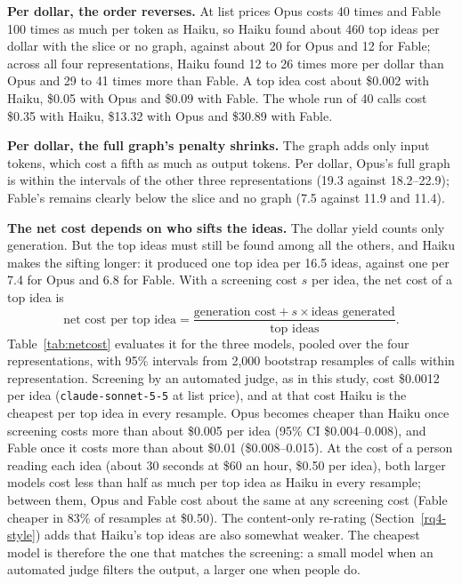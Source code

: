 \textbf{Per dollar, the order reverses.} At list prices Opus costs 40 times and Fable 100 times as much per token as Haiku, so Haiku found about 460 top ideas per dollar with the slice or no graph, against about 20 for Opus and 12 for Fable; across all four representations, Haiku found 12 to 26 times more per dollar than Opus and 29 to 41 times more than Fable. A top idea cost about \$0.002 with Haiku, \$0.05 with Opus and \$0.09 with Fable. The whole run of 40 calls cost \$0.35 with Haiku, \$13.32 with Opus and \$30.89 with Fable.

\textbf{Per dollar, the full graph's penalty shrinks.} The graph adds only input tokens, which cost a fifth as much as output tokens. Per dollar, Opus's full graph is within the intervals of the other three representations (19.3 against 18.2--22.9); Fable's remains clearly below the slice and no graph (7.5 against 11.9 and 11.4).

\textbf{The net cost depends on who sifts the ideas.} The dollar yield counts only generation. But the top ideas must still be found among all the others, and Haiku makes the sifting longer: it produced one top idea per 16.5 ideas, against one per 7.4 for Opus and 6.8 for Fable. With a screening cost $s$ per idea, the net cost of a top idea is
\[
\text{net cost per top idea} = \frac{\text{generation cost} + s \times \text{ideas generated}}{\text{top ideas}} .
\]
Table~\ref{tab:netcost} evaluates it for the three models, pooled over the four representations, with 95\% intervals from 2,000 bootstrap resamples of calls within representation. Screening by an automated judge, as in this study, cost \$0.0012 per idea (\texttt{claude-sonnet-5-5} at list price), and at that cost Haiku is the cheapest per top idea in every resample. Opus becomes cheaper than Haiku once screening costs more than about \$0.005 per idea (95\% CI \$0.004--0.008), and Fable once it costs more than about \$0.01 (\$0.008--0.015). At the cost of a person reading each idea (about 30 seconds at \$60 an hour, \$0.50 per idea), both larger models cost less than half as much per top idea as Haiku in every resample; between them, Opus and Fable cost about the same at any screening cost (Fable cheaper in 83\% of resamples at \$0.50). The content-only re-rating (Section~\ref{rq4-style}) adds that Haiku's top ideas are also somewhat weaker. The cheapest model is therefore the one that matches the screening: a small model when an automated judge filters the output, a larger one when people do.

